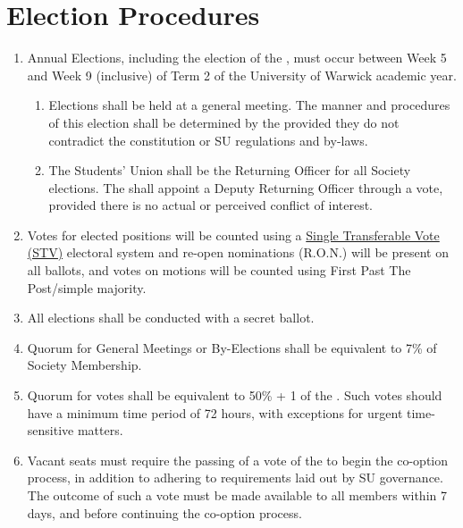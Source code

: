 \documentclass[a4paper,11pt,parskip=half-]{scrartcl} %
\begin{document}
\section{Election Procedures}
    \begin{enumerate}
        \item Annual Elections, including the election of the \exec, must occur between Week 5 and Week 9 (inclusive) of Term 2 of the University of Warwick academic year.
            \begin{enumerate}
                \item Elections shall be held at a  general meeting. The manner and procedures of this election shall be determined by the \exec provided they do not contradict the constitution or SU regulations and by-laws.

                \item The Students' Union shall be the Returning Officer for all Society elections. The \exec shall appoint a Deputy Returning Officer through a  vote, provided there is no actual or perceived conflict of interest.
            \end{enumerate}

        \item Votes for elected positions will be counted using a \href{https://prfound.org/resources/reference/reference-meek-rule/}{Single Transferable Vote (STV)} electoral system and re-open nominations (R.O.N.) will be present on all ballots, and votes on motions will be counted using First Past The Post/simple majority.

        \item All elections shall be conducted with a secret ballot.

        \item\label{general-quorum} Quorum for General Meetings or By-Elections shall be equivalent to 7\% of Society Membership.

        \item\label{exec-quorum} Quorum for \exec votes shall be equivalent to 50\% + 1 of the \exec. Such votes should have a minimum time period of 72 hours, with exceptions for urgent time-sensitive matters.

        \item Vacant seats must require the passing of a  vote of the \exec to begin the co-option process, in addition to adhering to requirements laid out by SU governance. The outcome of such a vote must be made available to all members within 7 days, and before continuing the co-option process.


\end{enumerate}
\end{document}
